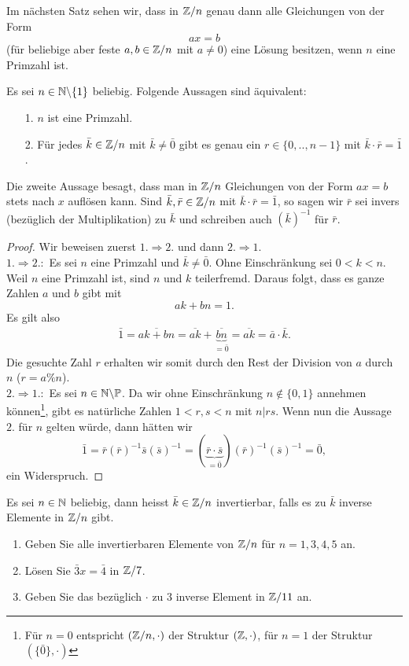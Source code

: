 Im nächsten Satz sehen wir, dass in $\mathbb{Z}/n$ genau dann alle Gleichungen von der Form
\[
ax=b
\]
(für beliebige aber feste $a,b\in\mathbb{Z}/n$ mit $a\neq 0$) eine Lösung besitzen, wenn $n$ eine Primzahl ist.
\begin{thrm}
Es sei $n\in\mathbb{N}\backslash\{1\}$ beliebig. Folgende Aussagen sind äquivalent:
\begin{enumerate}
\item[1.] $n$ ist eine Primzahl.
\item[2.] Für jedes $\bar k\in\mathbb{Z}/n$ mit $\bar k\neq\bar 0$ gibt es genau ein $r\in\{0,..,n-1\}$ mit $\bar k\cdot\bar r=\bar 1$.
\end{enumerate}
Die zweite Aussage besagt, dass man in $\mathbb{Z}/n$ Gleichungen von der Form $ax=b$ stets nach $x$ auflösen kann. Sind $\bar k,\bar r\in\mathbb{Z}/n$ mit $\bar k\cdot\bar r=\bar 1$, so sagen wir $\bar r$ sei invers (bezüglich der Multiplikation) zu $\bar k$ und schreiben auch $(\bar{k})^{-1}$ für $\bar r$.
\end{thrm}
\begin{proof}
Wir beweisen zuerst $1.\Rightarrow 2.$ und dann $2.\Rightarrow1.$ \\
%
$1.\Rightarrow 2.:$ Es sei $n$ eine Primzahl und $\bar k\neq\bar 0$. Ohne Einschränkung sei $0<k<n$. Weil $n$ eine Primzahl ist, sind $n$ und $k$ teilerfremd. Daraus folgt, dass es ganze Zahlen $a$ und $b$ gibt mit
\[
ak+bn=1.
\]
Es gilt also
\begin{align*}
\bar 1=\overline{ak+bn}
=\overline{ak}+\underbrace{\overline{bn}}_{=\bar 0}
=\overline{ak}=\bar a\cdot\bar k.
\end{align*}
Die gesuchte Zahl $r$ erhalten wir somit durch den Rest der Division von $a$ durch $n$ ($r=a\%n$).
\\
%
$2.\Rightarrow 1.:$ Es sei $n\in\mathbb{N}\backslash\mathbb{P}$. Da wir ohne Einschränkung $n\notin\{0, 1\}$ annehmen können\footnote{Für $n=0$ entspricht $(\mathbb{Z}/n,\cdot)$ der Struktur $(\mathbb{Z},\cdot)$, für $n=1$ der Struktur $(\{\bar 0\},\cdot)$}, gibt es natürliche Zahlen $1<r,s<n$ mit $n|rs$. Wenn nun die Aussage $2.$ für $n$ gelten würde, dann hätten wir
\[
 \bar1=\bar r(\bar r)^{-1}\bar s(\bar s)^{-1}= (\underbrace{\bar r\cdot \bar s}_{= \bar0}) (\bar r)^{-1}(\bar s)^{-1}=\bar0,
\]
ein Widerspruch.
\end{proof}



\begin{ueb}
Es sei $n\in\mathbb{N}$ beliebig, dann heisst $\bar k\in\mathbb{Z}/n$ invertierbar, falls es zu $\bar k$ inverse Elemente in $\mathbb{Z}/n$ gibt.
 \begin{enumerate}
  \item Geben Sie alle invertierbaren Elemente von $\mathbb{Z}/n$ für $n=1,3,4,5$ an.
\item Lösen Sie $\bar 3 x=\bar 4$ in $\mathbb{Z}/7$.
\item Geben Sie das bezüglich $\cdot$ zu $3$ inverse Element in $\mathbb{Z}/11$ an.
\end{enumerate}

\end{ueb}


